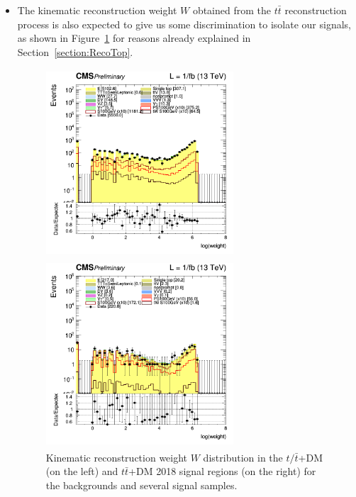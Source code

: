 \documentclass[a4paper, 10pt, openright]{report}
\begin{document}
\begin{itemize}
\item The kinematic reconstruction weight $W$ obtained from the $t \bar t$ reconstruction process is also expected to give us some discrimination to isolate our signals, as shown in Figure~\ref{fig:SRdisc5} for reasons already explained in Section~\ref{section:RecoTop}.

\begin{figure}[htbp]
\centering
\begin{minipage}[b]{.48\textwidth}
\includegraphics[width=7cm, height=7cm]{figs/log_cratio_topCR_ll_2j_signal1_reco_weight.png}
\end{minipage}\hfill
\begin{minipage}[b]{.48\textwidth}
\includegraphics[width=7cm, height=7cm]{figs/log_cratio_topCR_ll_2j_signal0_reco_weight.png}
\end{minipage} \hfill
\caption{Kinematic reconstruction weight $W$ distribution in the $t/ \bar t$+DM (on the left) and $t \bar t$+DM 2018 signal regions (on the right) for the backgrounds and several signal samples.}
\label{fig:SRdisc5}
\end{figure}


\end{itemize}
\end{document}
